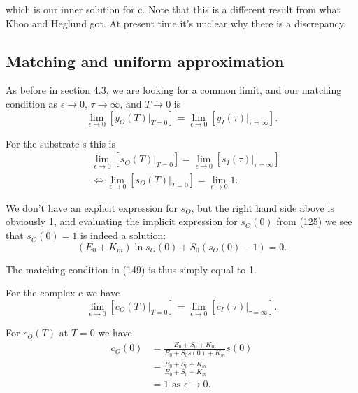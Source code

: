 \documentclass[12pt]{article}
\begin{document}
which is our inner solution for c. Note that this is a different
result from what Khoo and Heglund got. At present time it's unclear
why there is a discrepancy.

\subsection{Matching and uniform approximation}

As before in section 4.3, we are looking for a common limit, and our
matching condition as
$\epsilon \to 0 \text{, } \tau \to \infty \text{, and } T \to 0$ is
\begin{equation}
\lim_{\epsilon \to 0} [y_O(T) |_{T=0}] =
\lim_{\epsilon \to 0} [y_I(\tau) |_{\tau=\infty}].
\end{equation}

For the substrate s this is
\begin{align}
&\lim_{\epsilon \to 0} [s_O(T) |_{T=0}] =
  \lim_{\epsilon \to 0} [s_I(\tau) |_{\tau=\infty}] \\
&\iff \lim_{\epsilon \to 0} [s_O(T) |_{T=0}] =
  \lim_{\epsilon \to 0} 1.
\end{align}

We don't have an explicit expression for $s_O$, but the right hand
side above is obviously 1, and evaluating the implicit expression for
$s_O(0)$ from (125) we see that $s_O(0)=1$ is indeed a solution:
\begin{equation}
(E_0+K_m) \ln{s_O(0)} + S_0 (s_O(0) - 1) = 0.
\end{equation}

The matching condition in (149) is thus simply equal to 1.

For the complex c we have
\begin{equation}
\lim_{\epsilon \to 0} [c_O(T) |_{T=0}] =
  \lim_{\epsilon \to 0} [c_I(\tau) |_{\tau=\infty}].
\end{equation}


For $c_O(T)$ at $T=0$ we have
\begin{align}
c_O(0) &= \frac{E_0 + S_0 + K_m}{E_0+S_0 s(0) +K_m} s(0) \\
       &= \frac{E_0 + S_0 + K_m}{E_0+S_0  +K_m} \\
       &= 1 \text { as } \epsilon \to 0.
\end{align}
\end{document}
